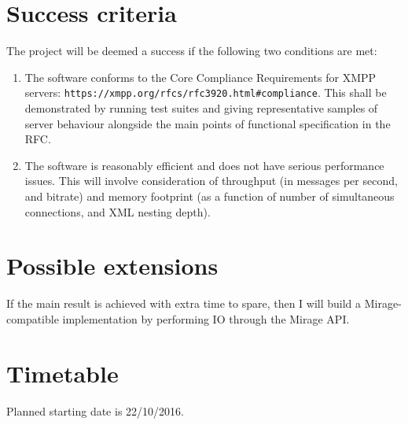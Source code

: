\documentclass[12pt,a4paper,twoside]{article}
\begin{document}
\section*{Success criteria}

The project will be deemed a success if the following two conditions are met:

\begin{enumerate}

\item The software conforms to the Core Compliance Requirements for XMPP servers: \texttt{https://xmpp.org/rfcs/rfc3920.html\#compliance}. This shall be demonstrated by running test suites and giving representative samples of server behaviour alongside the main points of functional specification in the RFC.

\item The software is reasonably efficient and does not have serious performance issues.
  This will involve consideration of throughput (in messages per second, and bitrate) and memory footprint (as a function of number of simultaneous connections, and XML nesting depth).

\end{enumerate}

\section*{Possible extensions}

If the main result is achieved with extra time to spare, then I will build a Mirage-compatible
implementation by performing IO through the Mirage API.

\section*{Timetable}

Planned starting date is 22/10/2016.
\end{document}
